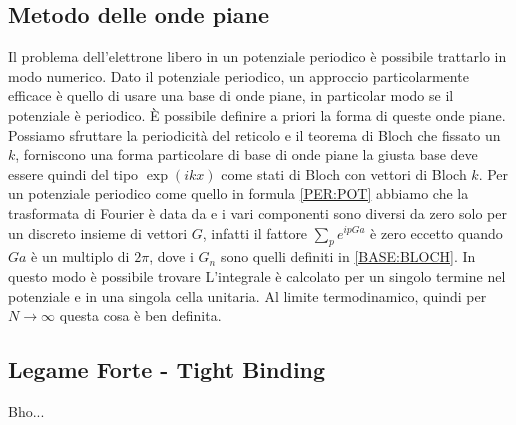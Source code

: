 \subsection{Metodo delle onde piane}
Il problema dell'elettrone libero in un potenziale periodico è possibile trattarlo in modo numerico. Dato il potenziale periodico, un approccio particolarmente efficace è quello di usare una base di onde piane, in particolar modo se il potenziale è periodico. \`E possibile definire a priori la forma di queste onde piane. Possiamo sfruttare la periodicità del reticolo e il teorema di Bloch che fissato un $k$, forniscono una forma particolare di base di onde piane
la giusta base deve essere quindi del tipo $\exp(ikx)$ come stati di Bloch con vettori di Bloch $k$. Per un potenziale periodico come quello in formula \ref{PER:POT} abbiamo che la trasformata di Fourier è data da
e i vari componenti sono diversi da zero solo per un discreto insieme di vettori $G$, infatti il fattore $\sum_pe^{ipGa}$ è zero eccetto quando $Ga$ è un multiplo di $2\pi$, dove i $G_n$ sono quelli definiti in \ref{BASE:BLOCH}. In questo modo è possibile trovare
L'integrale è calcolato per un singolo termine nel potenziale e in una singola cella unitaria. Al limite termodinamico, quindi per $N\to\infty$ questa cosa è ben definita.

\subsection{Legame Forte - Tight Binding}
Bho...

